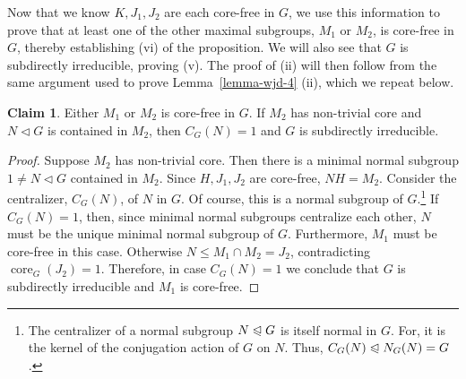 \documentclass[11pt]{amsart}
\theoremstyle{plain}
\theoremstyle{definition}
\newcounter{claim}
\newtheorem{claim}[claim]{Claim}
\theoremstyle{remark}
\numberwithin{theorem}{section}
\numberwithin{claim}{section}
\numberwithin{equation}{section}
\numberwithin{conjecture}{section}
\newcommand{\<}{\ensuremath{\langle}}
\renewcommand{\>}{\ensuremath{\rangle}}
\renewcommand{\leq}{\ensuremath{\leqslant}}
\newcommand{\ssubnormal}{\ensuremath{\vartriangleleft}}
\newcommand{\subnormal}{\ensuremath{\trianglelefteqslant}}
\newcommand{\core}{\ensuremath{\operatorname{core}}}
\newcommand{\0}{\ensuremath{\mathbf{0}}}
\newcommand{\1}{\ensuremath{\mathbf{1}}}
\newcommand{\2}{\ensuremath{\mathbf{2}}}
\newcommand{\3}{\ensuremath{\mathbf{3}}}
\newcommand{\4}{\ensuremath{\mathbf{4}}}
\newcommand{\5}{\ensuremath{\mathbf{5}}}
\begin{document}
Now that we know $K, J_1, J_2$ are each core-free in $G$, we use this
information to prove that at least one of the other maximal subgroups, 
$M_1$ or $M_2$, is core-free in $G$, thereby establishing (vi) of the proposition.  
We will also see that $G$ is subdirectly irreducible, proving (v).  The proof of
(ii) will then follow from the same argument used to prove 
Lemma~\ref{lemma-wjd-4} (ii), which we repeat below.

\begin{claim}
  Either $M_1$ or $M_2$ is core-free in $G$.  If $M_2$ has non-trivial core
  and $N\ssubnormal G$ is contained in $M_2$, then
  $C_G(N)=1$ and $G$ is subdirectly irreducible.
\end{claim}
\begin{proof}
  Suppose $M_2$ has non-trivial core.  Then there is 
a minimal normal subgroup $1\neq N \ssubnormal G$ 
  contained in $M_2$. %
  Since $H, J_1, J_2$ are core-free, $NH=M_2$.  Consider the centralizer,
  $C_G(N)$, of $N$ in $G$.  Of course, this is a normal subgroup 
  of $G$.\footnote{The centralizer of a normal subgroup $N\subnormal G$ is itself
    normal in $G$.  For, it is the kernel of the conjugation action of $G$ on
    $N$. Thus, $C_G(N) \subnormal N_G(N) = G$.} 
If $C_G(N) = 1$, then, since minimal normal subgroups
  centralize each other, $N$ must be the unique minimal normal subgroup of $G$.
  Furthermore, $M_1$ must be core-free in this case.  Otherwise 
  $N\leq M_1 \cap M_2 = J_2$, contradicting $\core_G(J_2)=1$. 
  Therefore, in case $C_G(N) = 1$ we 
  conclude that $G$ is subdirectly irreducible and $M_1$ is core-free.


\end{proof}
\end{document}
